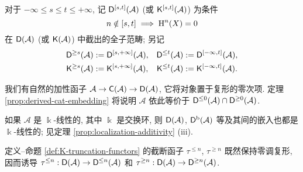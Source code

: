 \begin{definition}
	对于 $-\infty \leq s \leq t \leq +\infty$, 记 $\mathsf{D}^{[s,t]}(\mathcal{A})$ (或 $\mathsf{K}^{[s, t]}(\mathcal{A})$) 为条件
	\[ n \notin [s, t] \implies \operatorname{H}^n(X) = 0 \]
	在 $\mathsf{D}(\mathcal{A})$ (或 $\mathsf{K}(\mathcal{A})$) 中截出的全子范畴; 另记
	\begin{align*}
		\mathsf{D}^{\geq s}(\mathcal{A}) & := \mathsf{D}^{[s, +\infty]}(\mathcal{A}), &
		\mathsf{D}^{\leq t}(\mathcal{A}) & := \mathsf{D}^{[-\infty, t]}(\mathcal{A}), \\
		\mathsf{K}^{\geq s}(\mathcal{A}) & := \mathsf{K}^{[s, +\infty]}(\mathcal{A}), &
		\mathsf{K}^{\leq t}(\mathcal{A}) & := \mathsf{K}^{[-\infty, t]}(\mathcal{A}).
	\end{align*}
\end{definition}

我们有自然的加性函子 $\mathcal{A} \to \mathsf{C}(\mathcal{A}) \to \mathsf{D}(\mathcal{A})$, 它将对象置于复形的零次项. 定理 \ref{prop:derived-cat-embedding} 将说明 $\mathcal{A}$ 依此等价于 $\mathsf{D}^{\leq 0}(\mathcal{A}) \cap \mathsf{D}^{\geq 0}(\mathcal{A})$.

\begin{remark}
	如果 $\mathcal{A}$ 是 $\Bbbk$-线性的, 其中 $\Bbbk$ 是交换环, 则 $\mathsf{D}(\mathcal{A})$, $\mathsf{D}^{\mathrm{b}}(\mathcal{A})$ 等及其间的嵌入也都是 $\Bbbk$-线性的; 见定理 \ref{prop:localization-additivity} (iii).
\end{remark}

定义--命题 \ref{def:K-truncation-functors} 的截断函子 $\tau^{\leq n}$, $\tau^{\geq n}$ 既然保持零调复形, 因而诱导 $\tau^{\leq n}: \mathsf{D}(\mathcal{A}) \to \mathsf{D}^{\leq n}(\mathcal{A})$ 和 $\tau^{\geq n}: \mathsf{D}(\mathcal{A}) \to \mathsf{D}^{\geq n}(\mathcal{A})$.

